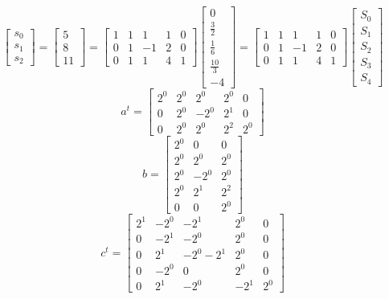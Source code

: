\documentclass{article}%
\begin{document}
\[%
\left[\begin{matrix}s_{0}\\s_{1}\\s_{2}\end{matrix}\right] = \left[\begin{matrix}5\\8\\11\end{matrix}\right] = \left[\begin{matrix}1 & 1 & 1 & 1 & 0\\0 & 1 & -1 & 2 & 0\\0 & 1 & 1 & 4 & 1\end{matrix}\right] \left[\begin{matrix}0\\\frac{3}{2}\\\frac{1}{6}\\\frac{10}{3}\\-4\end{matrix}\right] = \left[\begin{matrix}1 & 1 & 1 & 1 & 0\\0 & 1 & -1 & 2 & 0\\0 & 1 & 1 & 4 & 1\end{matrix}\right] \left[\begin{matrix}S_{0}\\S_{1}\\S_{2}\\S_{3}\\S_{4}\end{matrix}\right]%
\]%
\[%
a^{t} = \left[\begin{matrix}2^{0} & 2^{0} & 2^{0} & 2^{0} & 0\\0 & 2^{0} & - 2^{0} & 2^{1} & 0\\0 & 2^{0} & 2^{0} & 2^{2} & 2^{0}\end{matrix}\right]%
\]%
\[%
b = \left[\begin{matrix}2^{0} & 0 & 0\\2^{0} & 2^{0} & 2^{0}\\2^{0} & - 2^{0} & 2^{0}\\2^{0} & 2^{1} & 2^{2}\\0 & 0 & 2^{0}\end{matrix}\right]%
\]%
\[%
c^{t} = \left[\begin{matrix}2^{1} & - 2^{0} & - 2^{1} & 2^{0} & 0\\0 & - 2^{1} & - 2^{0} & 2^{0} & 0\\0 & 2^{1} & - 2^{0} - 2^{1} & 2^{0} & 0\\0 & - 2^{0} & 0 & 2^{0} & 0\\0 & 2^{1} & - 2^{0} & - 2^{1} & 2^{0}\end{matrix}\right]%
\]%
\end{document}

